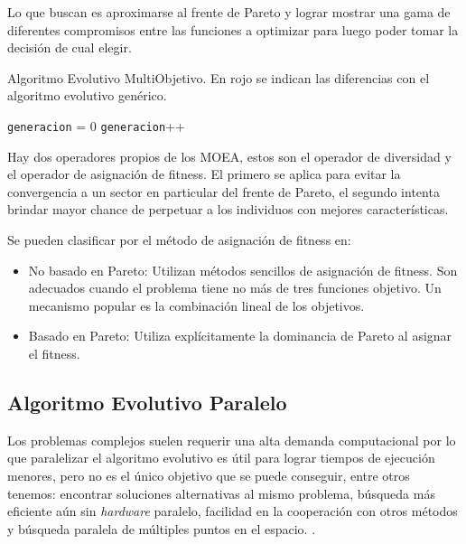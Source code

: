Lo que buscan es aproximarse al frente de Pareto y lograr mostrar una gama de diferentes compromisos entre las funciones a optimizar para luego poder tomar la decisión de cual elegir.


\begin{algorithm}%
	\caption{Algoritmo Evolutivo MultiObjetivo. En rojo se indican las diferencias con el algoritmo evolutivo genérico.}
	\label{alg:algoritmo_genetico_multiobjetivo}
	\begin{algorithmic} [1] 
		{
			\STATE \texttt{generacion} = 0
			\STATE {\textcolor{red}{Operador Diversidad (Pob(generacion))}}
			\STATE {\textcolor{red}{Asignar Fitness (Pob(generacion))}}
			\STATE \texttt{generacion}++
			\ENDWHILE
			\RETURN 	{\textcolor{red}{Frente de Pareto}}
		}
	\end{algorithmic}
\end{algorithm}

Hay dos operadores propios de los MOEA, estos son el operador de diversidad y el operador de asignación de fitness. El primero se aplica para evitar la convergencia a un sector en particular del frente de Pareto, el segundo intenta brindar mayor chance de perpetuar a los individuos con mejores características.

Se pueden clasificar por el método de asignación de fitness en:
\begin{itemize}
	\item No basado en Pareto: Utilizan métodos sencillos de asignación de fitness. Son adecuados cuando el problema tiene no más de tres funciones objetivo. Un mecanismo popular es la combinación lineal de los objetivos.
	\item Basado en Pareto: Utiliza explícitamente la dominancia de Pareto al asignar el fitness.
\end{itemize}



\subsection{Algoritmo Evolutivo Paralelo}
Los problemas complejos suelen requerir una alta demanda computacional por lo que paralelizar el algoritmo evolutivo es útil para lograr tiempos de ejecución menores, pero no es el único objetivo que se puede conseguir, entre otros tenemos:  encontrar soluciones alternativas al mismo problema, búsqueda más eficiente aún sin \emph{hardware} paralelo, facilidad en la cooperación con otros métodos y búsqueda paralela de múltiples puntos en el espacio. \citep{Alba2002}. 


